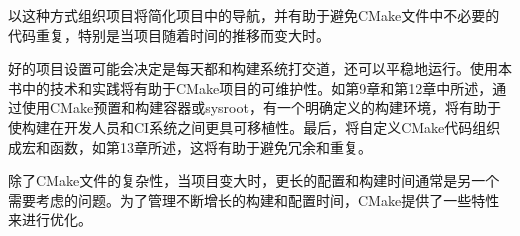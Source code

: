 以这种方式组织项目将简化项目中的导航，并有助于避免CMake文件中不必要的代码重复，特别是当项目随着时间的推移而变大时。

好的项目设置可能会决定是每天都和构建系统打交道，还可以平稳地运行。使用本书中的技术和实践将有助于CMake项目的可维护性。如第9章和第12章中所述，通过使用CMake预置和构建容器或sysroot，有一个明确定义的构建环境，将有助于使构建在开发人员和CI系统之间更具可移植性。最后，将自定义CMake代码组织成宏和函数，如第13章所述，这将有助于避免冗余和重复。

除了CMake文件的复杂性，当项目变大时，更长的配置和构建时间通常是另一个需要考虑的问题。为了管理不断增长的构建和配置时间，CMake提供了一些特性来进行优化。


















